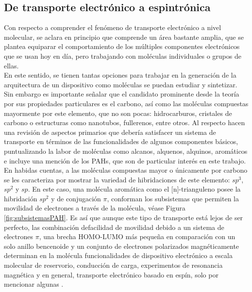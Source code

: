         \subsection{De transporte electrónico a espintrónica}
        Con respecto a comprender el fenómeno de transporte electrónico a nivel molecular, se aclara en principio que comprende un área bastante amplia, que se plantea equiparar el comportamiento de los múltiples componentes electrónicos que se usan hoy en día, pero trabajando con moléculas individuales o grupos de ellas.\\
        En este sentido, se tienen tantas opciones para trabajar en la generación de la arquitectura de un dispositivo como moléculas se puedan estudiar y sintetizar. Sin embargo es importante señalar que el candidato prominente desde la teoría por sus propiedades particulares es el carbono, así como las moléculas compuestas mayormente por este elemento, que no son pocas: hidrocarburos, cristales de carbono o estructuras como nanotubos, fullerenos, entre otros. Al respecto \textcite{cuevas2017molecular} hacen una revisión de aspectos primarios que debería satisfacer un sistema de transporte en términos de las funcionalidades de algunos componentes básicos, puntualizando la labor de moléculas como alcanos, alquenos, alquinos, aromáticos e incluye una mención de los PAHs, que son de particular interés en este trabajo.\\
        En habidas cuentas, a las moléculas compuestas mayor o únicamente por carbono se les caracteriza por mostrar la variedad de hibridaciones de este elemento: $sp^3$, $sp^2$ y $sp$. En este caso, una molécula aromática como el [n]-trianguleno posee la hibridación $sp^2$ y de conjugación $\pi$, conforman los subsistemas que permiten la movilidad de electrones a través de la molécula, véase Figura \ref{fig:subsistemasPAH}. Es así que aunque este tipo de transporte está lejos de ser perfecto, las combinación defacilidad de movilidad debido a un sistema de electrones $\pi$, una brecha HOMO-LUMO más pequeña en comparación con un solo anillo bencenoide y un conjunto de electrones polarizados magnéticamente determinan en la molécula funcionalidades de dispositivo electrónico a escala molecular de reservorio, conducción de carga, experimentos de resonancia magnética y en general, transporte electrónico basado en espín, solo por mencionar algunas \cite{pavlivcek2017synthesis, cuevas2017molecular,toader2021density}.
